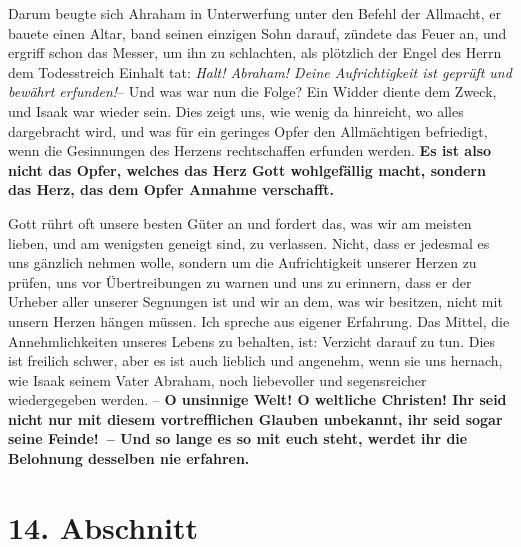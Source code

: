 Darum beugte sich Ahraham in Unterwerfung unter den Befehl der Allmacht,
 er
bauete einen Altar, band seinen einzigen Sohn darauf, zündete das Feuer an, und
ergriff schon das Messer, um ihn zu schlachten, als plötzlich der Engel des
Herrn dem Todesstreich Einhalt tat: \textit{Halt! Abraham! Deine Aufrichtigkeit
ist
geprüft und bewährt erfunden!}-- Und was war nun die Folge? Ein Widder diente
dem Zweck, und Isaak war wieder sein. Dies zeigt uns, wie wenig da
hinreicht, wo alles dargebracht wird, und was für ein geringes Opfer den
Allmächtigen befriedigt, wenn die Gesinnungen des Herzens rechtschaffen erfunden
werden. \label{ref:04_13_opfer} \textbf{Es ist also nicht das Opfer, welches
das Herz Gott wohlgefällig macht,
sondern das Herz, das dem Opfer Annahme verschafft.}

\medskip

Gott rührt oft unsere besten Güter an und fordert das, was wir am meisten
lieben, und am wenigsten geneigt sind, zu verlassen. Nicht, dass er jedesmal es
uns gänzlich nehmen wolle, sondern um die Aufrichtigkeit unserer Herzen zu
prüfen, uns vor Übertreibungen zu warnen und uns zu erinnern, dass er der
Urheber aller unserer Segnungen ist und wir an dem, was wir besitzen, nicht mit
unsern Herzen hängen müssen. Ich spreche aus eigener Erfahrung. Das Mittel, die
Annehmlichkeiten unseres Lebens zu behalten, ist: Verzicht darauf zu tun. Dies
ist freilich schwer, aber es ist auch lieblich und angenehm, wenn sie uns
hernach, wie Isaak seinem Vater Abraham, noch liebevoller und
segensreicher wiedergegeben werden. -- \label{ref:04_13_weltliche_christen}
\textbf{O unsinnige Welt! O weltliche Christen!
Ihr seid nicht nur mit diesem vortrefflichen Glauben unbekannt, ihr seid sogar
seine Feinde!~-- Und so lange es so mit euch steht, werdet ihr die Belohnung
desselben nie erfahren.}

\section{14. Abschnitt} \label{kap4_ab14}

